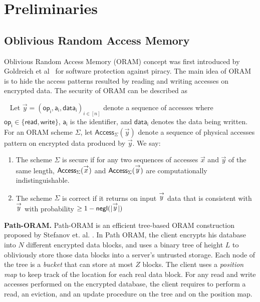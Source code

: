 \section{Preliminaries} %
\label{sec:preliminaries}

\subsection{Oblivious Random Access Memory} %
\label{sub:oblivious_ram}
Oblivious Random Access Memory (ORAM) concept was first introduced by Goldreich et al~\cite{Goldreich:1987} for software protection against piracy. The main idea of ORAM is to hide the access patterns resulted by reading and writing accesses on encrypted data. The security of ORAM can be described as
\begin{definition}~\cite{Stefanov:2013}
	Let
	$\stackrel{\rightarrow}{y}=(\mathsf{op_i,a_i,data_i})_{i\in [n]}$
	denote a sequence of accesses 
	where $\mathsf{op_i}\in \mathsf{\{read,write\}}$, 
	$\mathsf{a_i}$ is the identifier, 
	and $\mathsf{data_i}$ denotes the data being written. 
	For an ORAM scheme $\Sigma$, let $\mathsf{Access}_{\Sigma}(\stackrel{\rightarrow}{y})$ denote a sequence of physical accesses pattern on encrypted data produced by $\stackrel{\rightarrow}{y}$.
	We say:
	\begin{enumerate}
	  	\item The scheme $\Sigma$ is secure if for any two sequences of accesses $\stackrel{\rightarrow}{x}$ and $\stackrel{\rightarrow}{y}$ of the same length, $\mathsf{Access}_\Sigma(\stackrel{\rightarrow}{x})$ and $\mathsf{Access}_\Sigma(\stackrel{\rightarrow}{y})$ are computationally indistinguishable.
	  	\item The scheme $\Sigma$ is correct if it returns on input $\stackrel{\rightarrow}{y}$ data that is consistent with $\stackrel{\rightarrow}{y}$ with probability $\geq 1 - \mathsf{negl}(\lvert\stackrel{\rightarrow}{y}\rvert)$
  	\end{enumerate}
\end{definition}
\textbf{Path-ORAM.}
Path-ORAM is an efficient tree-based ORAM construction proposed by Stefanov et. al. \cite{Stefanov:2013}. 
In Path ORAM, the client encrypts his database into $N$ different encrypted data blocks, 
and uses a binary tree of height $L$ to obliviously store those data blocks into a server's untrusted storage. 
Each node of the tree is a \textit{bucket} that can store at most $Z$ blocks. 
The client uses a \textit{position map} to keep track of the location for each real data block. 
For any read and write accesses performed on the encrypted database, the client requires to perform a read, an eviction, and an update procedure on the tree and on the position map. 
